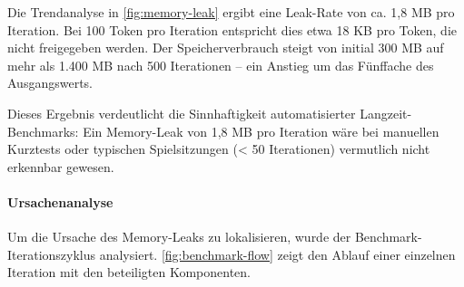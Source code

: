 Die Trendanalyse in \autoref{fig:memory-leak} ergibt eine Leak-Rate von ca. 1,8 \ac{MB} pro Iteration. Bei 100 Token pro Iteration entspricht dies etwa 18 \ac{KB} pro Token, die nicht freigegeben werden. Der Speicherverbrauch steigt von initial 300 \ac{MB} auf mehr als 1.400 \ac{MB} nach 500 Iterationen -- ein Anstieg um das Fünffache des Ausgangswerts.

Dieses Ergebnis verdeutlicht die Sinnhaftigkeit automatisierter Langzeit-Benchmarks: Ein Memory-Leak von 1,8 \ac{MB} pro Iteration wäre bei manuellen Kurztests oder typischen Spielsitzungen (< 50 Iterationen) vermutlich nicht erkennbar gewesen.

\paragraph{Ursachenanalyse}

Um die Ursache des Memory-Leaks zu lokalisieren, wurde der Benchmark-Iterationszyklus analysiert. \autoref{fig:benchmark-flow} zeigt den Ablauf einer einzelnen Iteration mit den beteiligten Komponenten.

